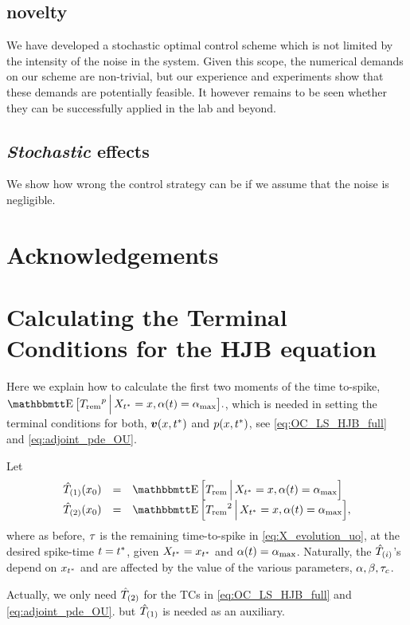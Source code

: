 \documentclass[12pt]{iopart}
\begin{document}
\subsection{novelty}
We have developed a stochastic optimal control scheme which is not limited
by the intensity of the noise in the system. Given this scope, the
numerical demands on our scheme are non-trivial, but our experience and
experiments show that these demands are potentially feasible. It
however remains to be seen whether they can be successfully applied in the lab
and beyond.

\subsection{{\sl Stochastic} effects}
We show how wrong the control strategy can be if we assume that the noise is
negligible.

\section{Acknowledgements}


\appendix
\section{Calculating the Terminal Conditions for the HJB equation}
\label{sec:valuefun_TCs}
Here we explain how to calculate the first two moments of the time to-spike,
$\Exp \big[\trem^p \,\Big|\, X_\T = x, \a(t) = \amax \big].$, which is needed in setting the terminal conditions for both,
${ \boldsymbol{v} }(x,{ t^* })$ and $p(x,{ t^* })$, see \cref{eq:OC_LS_HJB_full} and \cref{eq:adjoint_pde_OU}.

Let
\begin{equation}
\begin{array}{lcl}
\Tone(x_0) &=& \Exp \Big[\trem \,\Big|\, X_\T = x, \a(t) = \amax
\Big]
\\
\Ttwo(x_0) &=&
\Exp \Big[\trem^2 \,\Big|\, X_\T = x, \a(t) = \amax \Big],
\end{array}
\end{equation}
where as before, ${\tau}$ is the remaining time-to-spike in
\cref{eq:X_evolution_uo}, at the desired spike-time $t={ t^* }$, given $X_{ t^* } = x_{ t^* }$
and ${\alpha}(t) = { {\alpha}_{\textrm{max}} }$.
Naturally, the ${ \hat{T}_{(i)} }$'s depend on $x_{ t^* }$ and are affected by the value of the
various parameters, ${\alpha},{\beta},{ \tau_{c} }$.

Actually, we only  need ${ \hat{T}_{(2)} }$ for the TCs in \cref{eq:OC_LS_HJB_full} and \cref{eq:adjoint_pde_OU}.
but ${ \hat{T}_{(1)} }$ is needed as an auxiliary.
\end{document}
